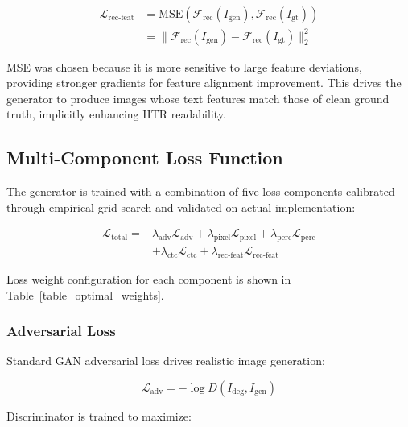 \documentclass[journal]{IEEEtran}
\begin{document}
\begin{equation}
\begin{split}
\mathcal{L}_{\text{rec-feat}} &= \text{MSE}(\mathcal{F}_{\text{rec}}(I_{\text{gen}}), \mathcal{F}_{\text{rec}}(I_{\text{gt}})) \\
&= \|\mathcal{F}_{\text{rec}}(I_{\text{gen}}) - \mathcal{F}_{\text{rec}}(I_{\text{gt}})\|_2^2
\end{split}
\end{equation}

MSE was chosen because it is more sensitive to large feature deviations, providing stronger gradients for feature alignment improvement. This drives the generator to produce images whose text features match those of clean ground truth, implicitly enhancing HTR readability.

\subsection{Multi-Component Loss Function}

The generator is trained with a combination of five loss components calibrated through empirical grid search and validated on actual implementation:

\begin{equation}
\begin{split}
\mathcal{L}_{\text{total}} = &\lambda_{\text{adv}}\mathcal{L}_{\text{adv}} + \lambda_{\text{pixel}}\mathcal{L}_{\text{pixel}} + \lambda_{\text{perc}}\mathcal{L}_{\text{perc}} \\
&+ \lambda_{\text{ctc}}\mathcal{L}_{\text{ctc}} + \lambda_{\text{rec-feat}}\mathcal{L}_{\text{rec-feat}}
\end{split}
\end{equation}

Loss weight configuration for each component is shown in Table~\ref{table_optimal_weights}.

\subsubsection{Adversarial Loss}

Standard GAN adversarial loss drives realistic image generation:

\begin{equation}
\mathcal{L}_{\text{adv}} = -\log D(I_{\text{deg}}, I_{\text{gen}})
\end{equation}

Discriminator is trained to maximize:
\end{document}
